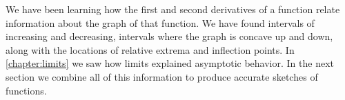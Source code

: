 We have been learning how the first and second derivatives of a function relate information about the graph of that function. We have found intervals of increasing and decreasing, intervals where the graph is concave up and down, along with the locations of relative extrema and inflection points. In \autoref{chapter:limits} we saw how limits explained asymptotic behavior. In the next section we combine all of this information to produce accurate sketches of functions.




